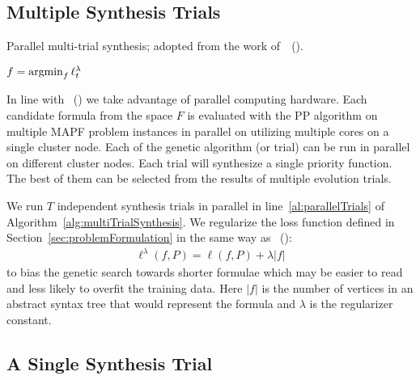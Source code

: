 \documentclass[letterpaper]{article} %
\newcommand{\bea}{\begin{eqnarray}}
\newcommand{\eea}{\end{eqnarray}}
\newcommand{\argmin}{\operatornamewithlimits{argmin}\limits}
\newcommand{\citea}[1]{\citeauthor{#1}~(\citeyear{#1})}
\begin{document}
\subsection{Multiple Synthesis Trials}
\label{mult_syn_trials}

\begin{algorithm}[t!]
\DontPrintSemicolon
\caption{Parallel multi-trial synthesis; adopted from the work of~\citea{bulitko222portability}.}
\label{alg:multiTrialSynthesis}
{\footnotesize
{}


\Return $ f = \argmin\nolimits_f \ell^\lambda_t $ \; \label{al:bestTrial}
}
\end{algorithm}

In line with \citea{bulitko222portability} we take advantage of parallel computing hardware. Each candidate formula from the space $ F $ is evaluated with the PP algorithm on multiple MAPF problem instances in parallel on utilizing multiple cores on a single cluster node.  Each of the genetic algorithm (or trial) can be run in parallel on different cluster nodes. Each trial will synthesize a single priority function. The best of them can be selected from the results of multiple evolution trials.

We run $ T $ independent synthesis trials in parallel in line~\ref{al:parallelTrials} of Algorithm~\ref{alg:multiTrialSynthesis}. We regularize the loss function defined in Section~\ref{sec:problemFormulation} in the same way as \citea{bulitko222portability}: \bea \ell^{\lambda}(f, P) = \ell(f, P) + \lambda |f|\eea to bias the genetic search towards shorter formulae which may be easier to read and less likely to overfit the training data. Here $ |f| $ is the number of vertices in an abstract syntax tree that would represent the formula and $ \lambda $ is the regularizer constant.


\subsection{A Single Synthesis Trial}
\label{sec:singleTrial}
\end{document}
